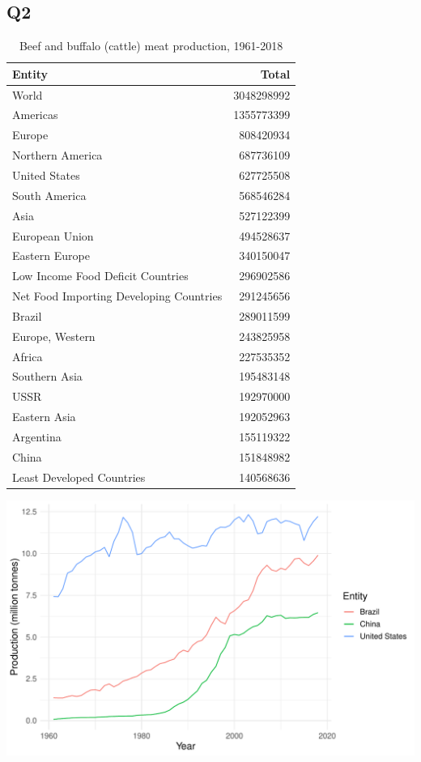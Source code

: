 \documentclass[11pt,a4paper,]{article}
\begin{document}
\clearpage

\hypertarget{q2}{%
\subsection{Q2}\label{q2}}

\begin{table}

\caption{\label{tab:cattle}Beef and buffalo (cattle) meat production, 1961-2018}
\centering
\begin{tabular}[t]{lr}
\toprule
Entity & Total\\
\midrule
World & 3048298992\\
Americas & 1355773399\\
Europe & 808420934\\
Northern America & 687736109\\
United States & 627725508\\
\addlinespace
South America & 568546284\\
Asia & 527122399\\
European Union & 494528637\\
Eastern Europe & 340150047\\
Low Income Food Deficit Countries & 296902586\\
\addlinespace
Net Food Importing Developing Countries & 291245656\\
Brazil & 289011599\\
Europe, Western & 243825958\\
Africa & 227535352\\
Southern Asia & 195483148\\
\addlinespace
USSR & 192970000\\
Eastern Asia & 192052963\\
Argentina & 155119322\\
China & 151848982\\
Least Developed Countries & 140568636\\
\bottomrule
\end{tabular}
\end{table}

\includegraphics{report_files/figure-latex/cattle-1.pdf}
\end{document}
